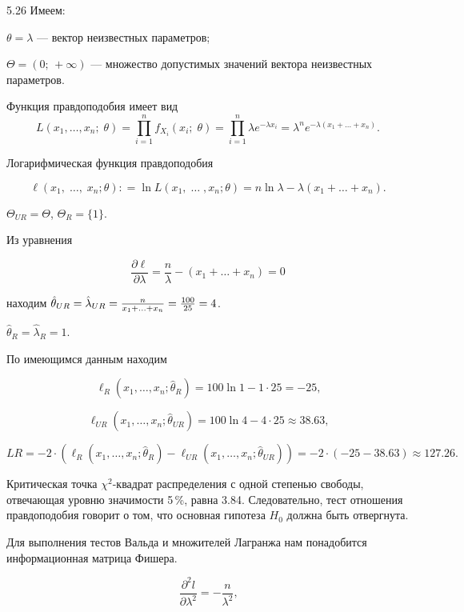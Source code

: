 \protect \hypertarget {soln:5.26}{}
\begin{solution}{{5.26}}
  Имеем:

$\theta = \lambda$ — вектор неизвестных параметров;

$\Theta = (0; \, + \infty)$ — множество допустимых значений вектора неизвестных параметров.

Функция правдоподобия имеет вид
\[
L({x_1}, \ldots ,{x_n};\;\theta) = \prod\limits_{i = 1}^n {{f_{{X_i}}}({x_i};\;\theta )}  = \prod\limits_{i = 1}^n {\lambda {e^{ - \lambda {x_i}}}}  = {\lambda ^n}{e^{ - \lambda ({x_1} +  \ldots  + {x_n})}} \text{.}
\]

Логарифмическая функция правдоподобия

\[
\ell({x_1},\; \ldots ,\;{x_n};\theta ): = \ln L({x_1},\; \ldots \;,{x_n};\theta ) = n\ln \lambda  - \lambda ({x_1} +  \ldots  + {x_n}) \text{.}
\]


$\Theta_{UR} = \Theta$, $\Theta_{R} = \{1\}$.

Из уравнения

\[\frac{{\partial \ell}}{{\partial \lambda }} = \frac{n}{\lambda } - ({x_1} +  \ldots  + {x_n}) = 0\]

находим ${\hat \theta _{UR}} = {\hat \lambda _{UR}} = {\textstyle{n \over {{x_1} +  \ldots  + {x_n}}}} = {\textstyle{{100} \over {25}}} = 4$.

${\hat \theta _R} = {\hat \lambda _R} = 1$.

По имеющимся данным находим


\[
{\ell_R}({x_1}, \ldots,{x_n};{\hat \theta _R}) = 100\ln 1 - 1 \cdot 25 =  - 25 \text{,}
\]

\[
{\ell_{UR}}({x_1}, \ldots,{x_n};{\hat \theta _{UR}}) = 100\ln 4 - 4 \cdot 25 \approx {{38}}{{.63}} \text{,}
\]

\[
LR =  - 2 \cdot ({\ell_R}({x_1}, \ldots,{x_n};{\hat \theta _R}) - {\ell_{UR}}({x_1}, \ldots,{x_n};{\hat \theta _{UR}})) =  - 2 \cdot ( - 25 - {{38}}{{.63}}) \approx {{127}}{{.26}} \text{.}
\]

Критическая точка $\chi^2$-квадрат распределения с одной степенью свободы, отвечающая уровню значимости 5\,\%, равна 3.84. Следовательно, тест отношения правдоподобия говорит о том, что основная гипотеза $H_0$ должна быть отвергнута.

Для выполнения тестов Вальда и множителей Лагранжа нам понадобится информационная матрица Фишера.

\[
\frac{{{\partial ^2}l}}{{\partial {\lambda ^2}}} =  - \frac{n}{{{\lambda ^2}}} \text{,}
\]


\end{solution}
